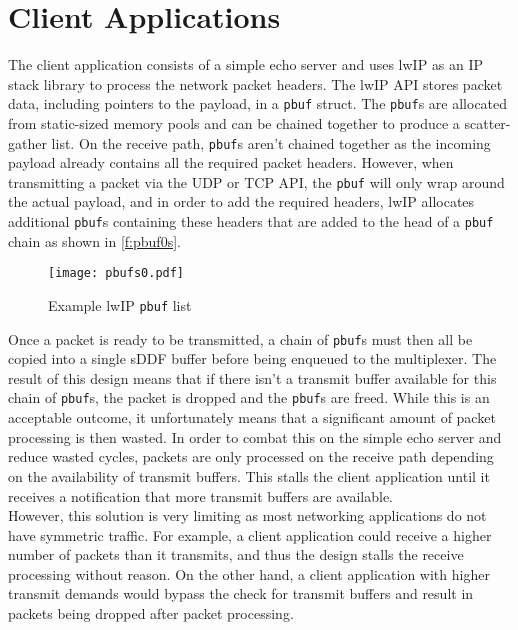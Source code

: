 \section{Client Applications}\label{s:client_apps}

The client application consists of a simple echo server and uses lwIP \cite{Dunkels_01} as an IP
stack library to process the network packet headers. The lwIP API stores packet data, including pointers
to the payload, in a \texttt{pbuf} struct. The \texttt{pbuf}s are allocated from static-sized memory pools and can be chained
together to produce a scatter-gather list.
On the receive path, \texttt{pbuf}s aren't chained together as the incoming payload already contains
all the required packet headers. However, when transmitting a packet via the UDP or TCP API, the \texttt{pbuf} will
only wrap around the actual payload, and in order to add the required headers, lwIP allocates additional \texttt{pbuf}s
containing these headers that are added to the head of a \texttt{pbuf} chain as shown in \autoref{f:pbuf0s}. \\

\begin{figure}[h]
    \centering
    \texttt{[image: pbufs0.pdf]}
    \caption{Example lwIP \texttt{pbuf} list}
    \label{f:pbuf0s}
\end{figure}

Once a packet is ready to be transmitted,
a chain of \texttt{pbuf}s must then all be copied into a single sDDF buffer before being enqueued to the multiplexer.
The result of this design means that if there isn't a transmit buffer available for this chain of \texttt{pbuf}s, the
packet is dropped and the \texttt{pbuf}s are freed. While this is an acceptable outcome, it unfortunately means that a significant
amount of packet processing is then wasted. In order to combat this on the simple echo server and reduce
wasted cycles, packets are only
processed on the receive path depending on the availability of transmit buffers. This stalls the client application
until it receives a notification that more transmit buffers are available. \\

However, this solution is very limiting
as most networking applications do not have symmetric traffic. For example, a client application could receive a
higher number of packets than it transmits, and thus the design stalls the receive processing without reason. 
On the other hand, a client application with higher transmit demands would bypass the check for transmit buffers and result in
packets being dropped after packet processing. \\

